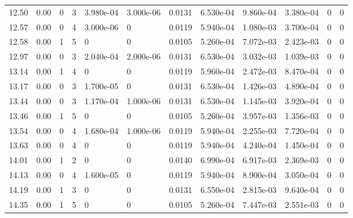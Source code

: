 \documentclass[preview]{standalone}
\begin{document}
{{{\begin{tabular}{L{1.2cm}C{1.2cm} C{0.3cm}C{0.5cm} C{1.4cm}C{1.4cm} C{1.4cm}C{1.4cm} C{1.6cm}C{1.6cm} C{1.6cm}C{1.6cm}}
  12.50  &  0.00  & 0     &  3 &  3.980e-04  & 3.000e-06  &  0.0131&   6.530e-04& 9.860e-04 & 3.380e-04   &  0 & 0  \\ 
  12.57  &  0.00  & 0     &  4 &  3.000e-06  & 0  &  0.0119&   5.940e-04& 1.080e-03 & 3.700e-04   &  0 & 0  \\ 
  12.58  &  0.00  & 1     &  5 &  0  & 0  &  0.0105&   5.260e-04& 7.072e-03 & 2.423e-03   &  0 & 0  \\ 
  12.97  &  0.00  & 0     &  3 &  2.040e-04  & 2.000e-06  &  0.0131&   6.530e-04& 3.032e-03 & 1.039e-03   &  0 & 0  \\ 
  13.14  &  0.00  & 1     &  4 &  0  & 0  &  0.0119&   5.960e-04& 2.472e-03 & 8.470e-04   &  0 & 0  \\ 
  13.17  &  0.00  & 0     &  3 &  1.700e-05  & 0  &  0.0131&   6.530e-04& 1.426e-03 & 4.890e-04   &  0 & 0  \\ 
  13.44  &  0.00  & 0     &  3 &  1.170e-04  & 1.000e-06  &  0.0131&   6.530e-04& 1.145e-03 & 3.920e-04   &  0 & 0  \\ 
  13.46  &  0.00  & 1     &  5 &  0  & 0  &  0.0105&   5.260e-04& 3.957e-03 & 1.356e-03   &  0 & 0  \\ 
  13.54  &  0.00  & 0     &  4 &  1.680e-04  & 1.000e-06  &  0.0119&   5.940e-04& 2.255e-03 & 7.720e-04   &  0 & 0  \\ 
  13.63  &  0.00  & 0     &  4 &  0  & 0  &  0.0119&   5.940e-04& 4.240e-04 & 1.450e-04   &  0 & 0  \\ 
  14.01  &  0.00  & 1     &  2 &  0  & 0  &  0.0140&   6.990e-04& 6.917e-03 & 2.369e-03   &  0 & 0  \\ 
  14.13  &  0.00  & 0     &  4 &  1.600e-05  & 0  &  0.0119&   5.940e-04& 8.900e-04 & 3.050e-04   &  0 & 0  \\ 
  14.19  &  0.00  & 1     &  3 &  0  & 0  &  0.0131&   6.550e-04& 2.815e-03 & 9.640e-04   &  0 & 0  \\ 
  14.35  &  0.00  & 1     &  5 &  0  & 0  &  0.0105&   5.260e-04& 7.447e-03 & 2.551e-03   &  0 & 0  \\ 
\hline 
\end{tabular} 

}}}
\end{document}
